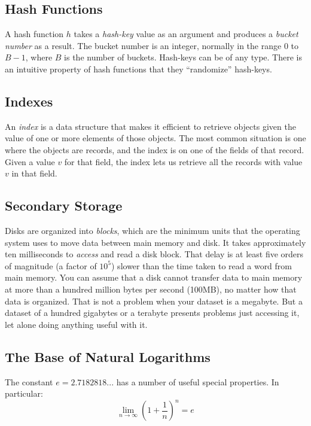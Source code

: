 \subsection{Hash Functions}\label{subsec:hash-functions}

A hash function $h$ takes a \textit{hash-key} value as an argument and produces a \textit{bucket number} as a result. The bucket number is an integer, normally in the range $0$ to $B - 1$, where $B$ is the number of buckets. Hash-keys can be of any type. There is an intuitive property of hash functions that they ``randomize'' hash-keys.

\subsection{Indexes}\label{subsec:indexes}

An \textit{index} is a data structure that makes it efficient to retrieve objects given the value of one or more elements of those objects. The most common situation is one where the objects are records, and the index is on one of the fields of that record. Given a value $v$ for that field, the index lets us retrieve all the records with value $v$ in that field.

\subsection{Secondary Storage}\label{subsec:secondary-storage}

Disks are organized into \textit{blocks}, which are the minimum units that the operating system uses to move data between main memory and disk. It takes approximately ten milliseconds to \textit{access} and read a disk block. That delay is at least five orders of magnitude (a factor of $10^5$) slower than the time taken to read a word from main memory. You can assume that a disk cannot transfer data to main memory at more than a hundred million bytes per second (100MB), no matter how that data is organized. That is not a problem when your dataset is a megabyte. But a dataset of a hundred gigabytes or a terabyte presents problems just accessing it, let alone doing anything useful with it.

\subsection{The Base of Natural Logarithms}\label{subsec:the-base-of-natural-logarithms}

The constant $e = 2.7182818...$ has a number of useful special properties. In particular:
\begin{equation*}
    \lim_{n \to \infty} \left(1 + \frac{1}{n}\right)^n = e
\end{equation*}
